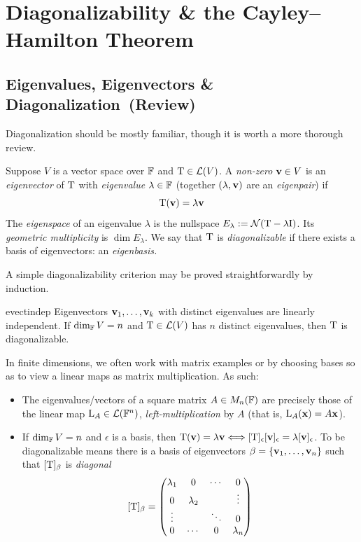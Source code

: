 \section{Diagonalizability \& the Cayley--Hamilton Theorem}

\subsection{Eigenvalues, Eigenvectors \& Diagonalization\ (Review)}

Diagonalization should be mostly familiar, though it is worth a more thorough review.

\begin{defn}{}{}
	Suppose $V$ is a vector space over $\mathbb{F}$ and $\mathrm{T}\in\mathcal{L}(V)$. A \emph{non-zero} ${\mathbf{v}}\in V$ is an \emph{eigenvector} of $\mathrm{T}$ with \emph{eigenvalue} $\lambda\in\mathbb{F}$ (together $(\lambda,{\mathbf{v}})$ are an \emph{eigenpair}) if
	\[
		\mathrm{T}({\mathbf{v}})=\lambda{\mathbf{v}}
	\]
	The \emph{eigenspace} of an eigenvalue $\lambda$ is the nullspace $E_\lambda:=\mathcal{N}(\mathrm{T}-\lambda\mathrm{I})$. Its \emph{geometric multiplicity} is $\dim E_\lambda$.\smallbreak
	We say that $\mathrm{T}$ is \emph{diagonalizable} if there exists a basis of eigenvectors: an \emph{eigenbasis.}
\end{defn}




A simple diagonalizability criterion may be proved straightforwardly by induction.

\begin{lemm}{}{evectindep}
	Eigenvectors ${\mathbf{{\mathbf{v}}}}_1,\ldots,{\mathbf{{\mathbf{v}}}}_{k}$ with distinct eigenvalues are linearly independent.\smallbreak
	If $\dim_{\mathbb{F}} V=n$ and $\mathrm{T}\in\mathcal{L}(V)$ has $n$ distinct eigenvalues, then $\mathrm{T}$ is diagonalizable.
\end{lemm}

In finite dimensions, we often work with matrix examples or by choosing bases so as to view a linear maps as matrix multiplication. As such:
\begin{itemize}
	\item The eigenvalues/vectors of a square matrix $A\in M_n(\mathbb{F})$ are precisely those of the linear map $\mathrm{L}_A\in\mathcal{L}(\mathbb{F}^n)$, \emph{left-multiplication} by $A$ (that is, $\mathrm{L}_A({\mathbf{x}})=A{\mathbf{x}}$).
	\item If $\dim_{\mathbb{F}} V=n$ and $\epsilon$ is a basis, then $\mathrm{T}({\mathbf{v}})=\lambda{\mathbf{v}} \Longleftrightarrow [\mathrm{T}]_\epsilon[{\mathbf{v}}]_\epsilon=\lambda[{\mathbf{v}}]_\epsilon$. To be diagonalizable means there is a basis of eigenvectors $\beta=\{{\mathbf{v}}_1,\ldots,{\mathbf{v}}_{n}\}$ such that $[\mathrm{T}]_\beta$ is \emph{diagonal}
	\[
		[\mathrm{T}]_\beta=
		\begin{pmatrix}
			\lambda_1&0&\cdots&0\\
			0&\lambda_2&&\vdots\\
			\vdots&&\ddots&0\\
			0&\cdots&0&\lambda_n
		\end{pmatrix}
	\]
\end{itemize}

